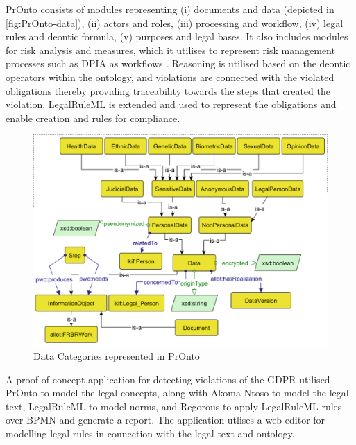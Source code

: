 PrOnto consists of modules representing (i) documents and data (depicted in \autoref{fig:PrOnto-data}), (ii) actors and roles, (iii) processing and workflow, (iv) legal rules and deontic formula, (v) purposes and legal bases. It also includes modules for risk analysis and measures, which it utilises to represent risk management processes such as DPIA as workflows \cite{palmirani_pronto_2018}. Reasoning is utilised based on the deontic operators within the ontology, and violations are connected with the violated obligations thereby providing traceability towards the steps that created the violation. LegalRuleML is extended and used to represent the obligations and enable creation and rules for compliance.
\begin{figure}[htbp]
    \centering
    \includegraphics[width=0.8\linewidth]{img/PrOnto_data.png}
    \caption{Data Categories represented in PrOnto \cite{palmirani_pronto_2018}}
    \label{fig:PrOnto-data}
\end{figure}

A proof-of-concept application for detecting violations of the GDPR \cite{monica_modelling_2018} utilised PrOnto to model the legal concepts, along with Akoma Ntoso to model the legal text, LegalRuleML to model norms, and Regorous to apply LegalRuleML rules over BPMN and generate a report. The application utlises a web editor for modelling legal rules in connection with the legal text and ontology.

